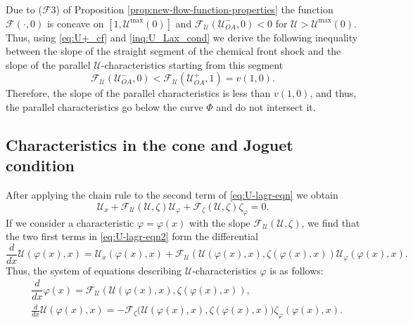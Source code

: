 \documentclass[12pt]{article}
\theoremstyle{definition}
\begin{document}
Due to ($\mathcal F$3) of Proposition \ref{prop:new-flow-function-properties} the function $\mathcal F(\cdot, 0)$ is concave on $[1, \mathcal U^{\max}(0)]$ and $\mathcal F_{\mathcal U}(\mathcal U_{OA}^-,0) < 0$ for $\mathcal U>\mathcal U^{\max}(0)$. Thus, using \eqref{eq:U+_cf} and \eqref{inq:U_Lax_cond} we derive
the following inequality between the slope of the straight segment of the chemical front shock and the slope of the parallel $\mathcal U$-characteristics starting from this segment
\[
\mathcal F_{\mathcal U}(\mathcal U_{OA}^-,0) < \mathcal F_{\mathcal U}(\mathcal U_{OA}^+,1) = v(1,0).
\]
Therefore, the slope of the parallel characteristics is less than $v(1, 0)$, and thus, the parallel characteristics go below the curve $\Phi$ and do not intersect it.

\subsection{Characteristics in the cone and Joguet condition}

After applying the chain rule to the second term of \eqref{eq:U-lagr-eqn}
we obtain
\begin{equation}
    \label{eq:U-lagr-eqn2}
    \mathcal U_x + \mathcal F_{\mathcal U}(\mathcal U, \zeta)\mathcal U_\varphi + \mathcal F_\zeta(\mathcal U, \zeta) \zeta_\varphi = 0.
\end{equation}
If we consider a characteristic $\varphi = \varphi(x)$ with the slope $\mathcal{F}_\mathcal{U}(\mathcal{U},\zeta)$, we find that the two first terms in \eqref{eq:U-lagr-eqn2} form the differential 
\[
\frac{d}{dx}\mathcal{U}(\varphi(x),x) = \mathcal U_x(\varphi(x),x) + \mathcal F_{\mathcal U}(\mathcal U(\varphi(x),x), \zeta(\varphi(x),x))\mathcal U_\varphi(\varphi(x),x).
\]
Thus, the system of equations describing $\mathcal U$-characteristics $\varphi$ is as follows:
\begin{align} 
    \label{eq:U-char-phi}
    &\dfrac{d}{dx}\varphi(x) = \mathcal{F}_\mathcal{U}(\mathcal{U}(\varphi(x),x),\zeta(\varphi(x),x)),\\
    \label{eq:U-char-U}
    &\frac{d}{dx}\mathcal{U}(\varphi(x),x)= 
    -\mathcal F_\zeta\big(\mathcal{U}(\varphi(x),x),\zeta(\varphi(x),x)\big)
    \zeta_\varphi(\varphi(x),x).
\end{align}
\end{document}
